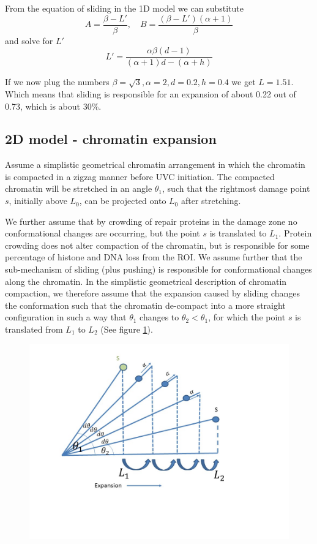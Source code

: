 \documentclass[12pt]{report}
\begin{document}
  From the equation of sliding in the 1D model we can substitute 
  \begin{equation*}
  A= \frac{\beta-L'}{\beta}, \quad B=\frac{(\beta -L')(\alpha+1)}{\beta}
  \end{equation*}
  and solve for $L'$ 
  \begin{equation*}
  L' = \frac{\alpha\beta(d-1)}{(\alpha+1)d -(\alpha+h)}
  \end{equation*}
  
  If we now plug the numbers $\beta=\sqrt{3}, \alpha =  2, d=0.2, h=0.4$ we get $L=1.51$. Which means that sliding is responsible for an expansion of about 0.22 out of 0.73, which is about 30\%.
  
\subsection{2D model - chromatin expansion}
 Assume a simplistic geometrical chromatin arrangement in which the chromatin is compacted in a zigzag manner before UVC initiation. The compacted chromatin will be stretched in an angle $\theta_1$, such that the rightmost damage point $s$, initially above $L_0$, can be projected onto $L_0$ after stretching. 
 
 We further assume that by crowding of repair proteins in the damage zone no conformational changes are occurring, but the point $s$ is translated to $L_1$. Protein crowding does not alter compaction of the chromatin, but is responsible for some percentage of histone and DNA loss from the ROI. 
 We assume further that the sub-mechanism of sliding (plus pushing) is responsible for conformational changes along the chromatin. In the simplistic geometrical description of chromatin compaction, we therefore assume that the expansion caused by sliding changes the conformation such that the chromatin de-compact into a more straight configuration in such a way that $\theta_1$ changes to $\theta_2<\theta_1$, for which the point $s$ is translated from $L_1$ to $L_2$ (See figure \ref{fig:slidingWithConformationalChanges}).

 
\begin{figure}[H]
\centering
\includegraphics[width=0.5\linewidth,height=0.4\textheight]{Images/SlidingModel/slidingWithConformationalChanges}
\caption{}
\label{fig:slidingWithConformationalChanges}
\end{figure}
\end{document}
